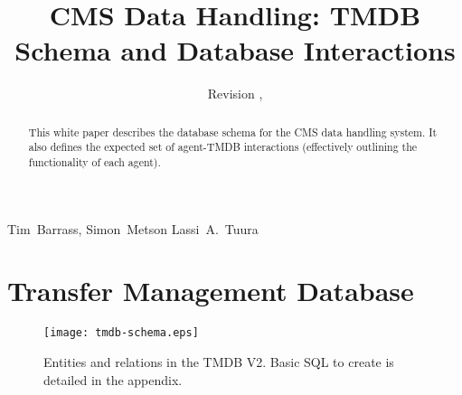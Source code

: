 \documentclass{cmspaper}
\begin{document}
\begin{titlepage}
  \whitepaper
  \date{Revision \RCSRevision, \RCSDate}
  \title{CMS Data Handling: TMDB Schema and Database Interactions}

  \begin{Authlist}
    Tim~Barrass, Simon~Metson
    Lassi~A.~Tuura
  \end{Authlist}

  \begin{abstract}
    This white paper describes the database schema for the CMS data
    handling system. It also defines the expected set of agent-TMDB
    interactions (effectively outlining the functionality of each
    agent).
  \end{abstract}

\end{titlepage}

\setcounter{page}{2}

\section{Transfer Management Database}

\begin{figure}[htbp]
\centering
  \texttt{[image: tmdb-schema.eps]}
  \caption{Entities and relations in the TMDB V2.  Basic SQL
    to create is detailed in the appendix.}
   \label{fig:schema}
\end{figure}
\end{document}
